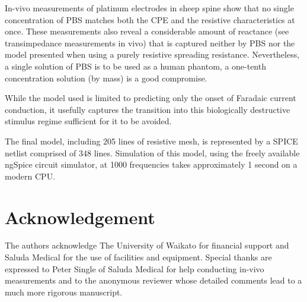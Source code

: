 \documentclass[journal, a4paper]{IEEEtran}
\begin{document}
In-vivo measurements of platinum electrodes in sheep spine show that no single concentration of PBS matches both the CPE and the resistive characteristics at once.
These measurements also reveal a considerable amount of reactance (see transimpedance measurements in vivo) that is captured neither by PBS nor the model presented when using a purely resistive spreading resistance.
Nevertheless, a single solution of PBS is to be used as a human phantom, a one-tenth concentration solution (by mass) is a good compromise.

While the model used is limited to predicting only the onset of Faradaic current conduction, it usefully captures the transition into this biologically destructive stimulus regime sufficient for it to be avoided. 
    
The final model, including 205 lines of resistive mesh, is represented by a SPICE netlist comprised of 348 lines. Simulation of this model, using the freely available ngSpice circuit simulator, at 1000 frequencies takes approximately 1 second on a modern CPU.

\section*{Acknowledgement}
The authors acknowledge The University of Waikato for financial support and Saluda Medical for the use of facilities and equipment. Special thanks are expressed to Peter Single of Saluda Medical for help conducting in-vivo measurements and to the anonymous reviewer whose detailed comments lead to a much more rigorous manuscript.
\end{document}
